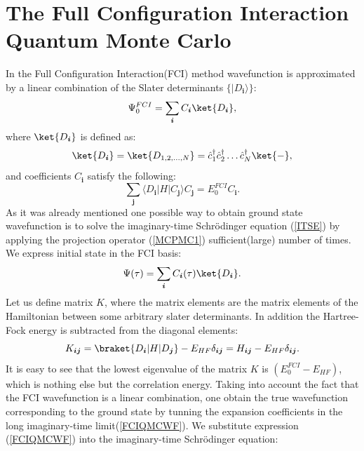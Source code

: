 \documentclass[twoside,english]{uiofysmaster}
\begin{document}
\section{The Full Configuration Interaction Quantum Monte Carlo}

In the Full Configuration Interaction(FCI) method wavefunction is approximated by a linear combination of the Slater determinants $\{|D_{\boldsymbol{i}}\rangle\}$:
\begin{equation}
\Psi_0^{FCI} = \sum_{\boldsymbol{i}}C_{\boldsymbol{i}}\ket{D_{\boldsymbol{i}}},
\end{equation}
where $\ket{D_{\boldsymbol{i}}}$ is defined as:
\begin{equation}
\ket{D_{\boldsymbol{i}}} = \ket{D_{1,2, \dots ,N}} = \hat{c}_1^\dagger \hat{c}_2^\dagger \dots \hat{c}_N^\dagger \ket{-}, 
\end{equation}
and coefficients $C_{\boldsymbol{i}}$ satisfy the following:
\begin{equation}
\sum_{\boldsymbol{j}} \langle D_{\boldsymbol{i}}|H|C_{\boldsymbol{j}} \rangle C_{\boldsymbol{j}}=E_0^{FCI}C_{\boldsymbol{i}}.
\end{equation}
As it was already mentioned one possible way to obtain ground state wavefunction is to solve the imaginary-time Schr\"{o}dinger equation (\ref{ITSE}) by applying the projection operator (\ref{MCPMC1}) sufficient(large) number of times. We express initial state in the FCI basis:
\begin{equation}\label{FCIQMCWF}
\Psi(\tau) = \sum_{\boldsymbol{i}}C_{\boldsymbol{i}}(\tau)\ket{D_{\boldsymbol{i}}}.
\end{equation}
Let us define matrix $K$, where the matrix elements are the matrix elements of the Hamiltonian between some arbitrary slater determinants. In addition the Hartree-Fock energy is subtracted from the diagonal elements:
\begin{equation}
	K_{\boldsymbol{ij}} = \braket{D_{\boldsymbol{i}}|H|D_{\boldsymbol{j}}}-E_{HF}\delta_{\boldsymbol{ij}} = H_{\boldsymbol{ij}}-E_{HF}\delta_{\boldsymbol{ij}}.
\end{equation}
It is easy to see that the lowest eigenvalue of the matrix $K$ is $(E_0^{FCI}-E_{HF})$, which is nothing else but the correlation energy. Taking into account the fact that the FCI wavefunction is a linear combination, one obtain the true wavefunction corresponding to the ground state by tunning the expansion coefficients in the long imaginary-time limit(\ref{FCIQMCWF}).
We substitute expression (\ref{FCIQMCWF}) into the imaginary-time Schr\"{o}dinger equation:
\end{document}
